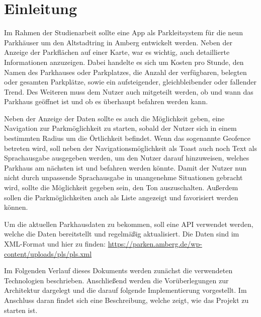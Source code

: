 \chapter{Einleitung}

Im Rahmen der Studienarbeit sollte eine App als Parkleitsystem für die neun Parkhäuser um den Altstadtring in Amberg entwickelt werden. Neben der Anzeige der Parkflächen auf einer Karte, war es wichtig, auch detaillierte Informationen anzuzeigen. Dabei handelte es sich um Kosten pro Stunde, den Namen des Parkhauses oder Parkplatzes, die Anzahl der verfügbaren, belegten oder gesamten Parkplätze, sowie ein aufsteigender, gleichbleibender oder fallender Trend. Des Weiteren muss dem Nutzer auch mitgeteilt werden, ob und wann das Parkhaus geöffnet ist und ob es überhaupt befahren werden kann.

Neben der Anzeige der Daten sollte es auch die Möglichkeit geben, eine Navigation zur Parkmöglichkeit zu starten, sobald der Nutzer sich in einem bestimmten Radius um die Örtlichkeit befindet. Wenn das sogenannte Geofence betreten wird, soll neben der Navigationsmöglichkeit als Toast auch noch Text als Sprachausgabe ausgegeben werden, um den Nutzer darauf hinzuweisen, welches Parkhaus am nächsten ist und befahren werden könnte. Damit der Nutzer nun nicht durch unpassende Sprachausgabe in unangenehme Situationen gebracht wird, sollte die Möglichkeit gegeben sein, den Ton auszuschalten. Außerdem sollen die Parkmöglichkeiten auch als Liste angezeigt und favorisiert werden können.

Um die aktuellen Parkhausdaten zu bekommen, soll eine API verwendet werden, welche die Daten bereitstellt und regelmäßig aktualisiert. Die Daten sind im XML-Format und hier zu finden: \url{https://parken.amberg.de/wp-content/uploads/pls/pls.xml}

Im Folgenden Verlauf dieses Dokuments werden zunächst die verwendeten Technologien beschrieben. Anschließend werden die Vorüberlegungen zur Architektur dargelegt und die darauf folgende Implementierung vorgestellt. Im Anschluss daran findet sich eine Beschreibung, welche zeigt, wie das Projekt zu starten ist.